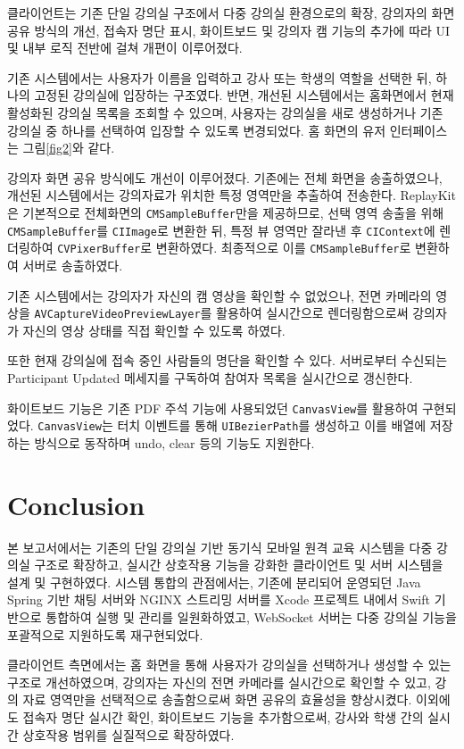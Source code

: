 \documentclass[pdflatex,sn-mathphys-num]{sn-jnl}%
\theoremstyle{thmstyleone}%
\theoremstyle{thmstyletwo}%
\theoremstyle{thmstylethree}%
\begin{document}
클라이언트는 기존 단일 강의실 구조에서 다중 강의실 환경으로의 확장, 강의자의 화면 공유 방식의 개선, 접속자 명단 표시, 화이트보드 및 강의자 캠 기능의 추가에 따라 UI 및 내부 로직 전반에 걸쳐 개편이 이루어졌다.

기존 시스템에서는 사용자가 이름을 입력하고 강사 또는 학생의 역할을 선택한 뒤, 하나의 고정된 강의실에 입장하는 구조였다. 반면, 개선된 시스템에서는 홈화면에서 현재 활성화된 강의실 목록을 조회할 수 있으며, 사용자는 강의실을 새로 생성하거나 기존 강의실 중 하나를 선택하여 입장할 수 있도록 변경되었다. 홈 화면의 유저 인터페이스는 그림\ref{fig2}와 같다.

강의자 화면 공유 방식에도 개선이 이루어졌다. 기존에는 전체 화면을 송출하였으나, 개선된 시스템에서는 강의자료가 위치한 특정 영역만을 추출하여 전송한다. ReplayKit\cite{ReplayKit}은 기본적으로 전체화면의 \verb+CMSampleBuffer+만을 제공하므로, 선택 영역 송출을 위해 \verb+CMSampleBuffer+를 \verb+CIImage+로 변환한 뒤, 특정 뷰 영역만 잘라낸 후 \verb+CIContext+에 렌더링하여 \verb+CVPixerBuffer+로 변환하였다. 최종적으로 이를 \verb+CMSampleBuffer+로 변환하여 서버로 송출하였다.

기존 시스템에서는 강의자가 자신의 캠 영상을 확인할 수 없었으나, 전면 카메라의 영상을 \verb+AVCaptureVideoPreviewLayer+를 활용하여 실시간으로 렌더링함으로써 강의자가 자신의 영상 상태를 직접 확인할 수 있도록 하였다.

또한 현재 강의실에 접속 중인 사람들의 명단을 확인할 수 있다. 서버로부터 수신되는 Participant Updated 메세지를 구독하여 참여자 목록을 실시간으로 갱신한다.

화이트보드 기능은 기존 PDF 주석 기능에 사용되었던 \verb+CanvasView+를 활용하여 구현되었다. \verb+CanvasView+는 터치 이벤트를 통해 \verb+UIBezierPath+를 생성하고 이를 배열에 저장하는 방식으로 동작하며 undo, clear 등의 기능도 지원한다.

\section{Conclusion}\label{sec4}

본 보고서에서는 기존의 단일 강의실 기반 동기식 모바일 원격 교육 시스템을 다중 강의실 구조로 확장하고, 실시간 상호작용 기능을 강화한 클라이언트 및 서버 시스템을 설계 및 구현하였다. 시스템 통합의 관점에서는, 기존에 분리되어 운영되던 Java Spring 기반 채팅 서버와 NGINX 스트리밍 서버를 Xcode 프로젝트 내에서 Swift 기반으로 통합하여 실행 및 관리를 일원화하였고, WebSocket 서버는 다중 강의실 기능을 포괄적으로 지원하도록 재구현되었다.

클라이언트 측면에서는 홈 화면을 통해 사용자가 강의실을 선택하거나 생성할 수 있는 구조로 개선하였으며, 강의자는 자신의 전면 카메라를 실시간으로 확인할 수 있고, 강의 자료 영역만을 선택적으로 송출함으로써 화면 공유의 효율성을 향상시켰다. 이외에도 접속자 명단 실시간 확인, 화이트보드 기능을 추가함으로써, 강사와 학생 간의 실시간 상호작용 범위를 실질적으로 확장하였다.
\end{document}
